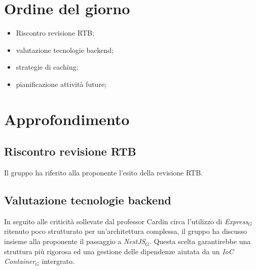 \documentclass[10pt, letterpaper]{article}
\begin{document}
\makeTitlePage

\newpage

\tableofcontents

\newpage


\makeMeetingParticipantsTable

\section{Ordine del giorno}
\begin{itemize}
  \item Riscontro revisione RTB;
  \item valutazione tecnologie backend;
  \item strategie di caching;
  \item pianificazione attività future;
\end{itemize}

\section{Approfondimento}

\subsection{Riscontro revisione RTB}
Il gruppo ha riferito alla proponente l'esito della revisione RTB. 

\subsection{Valutazione tecnologie backend}
In seguito alle criticità sollevate dal professor Cardin circa l'utilizzo di \textit{Express$_{G}$} ritenuto poco strutturato per un'architettura complessa, il gruppo ha discusso insieme alla proponente il passaggio a \textit{NestJS$_{G}$}. Questa scelta garantirebbe una struttura più rigorosa ed una gestione delle dipendenze aiutata da un \textit{IoC Container$_{G}$} intergrato.
\end{document}
